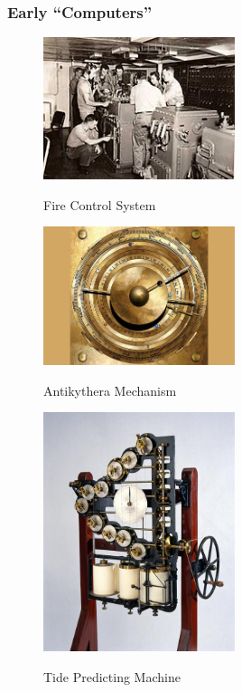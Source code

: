 \documentclass{beamer}
\begin{document}
%
%
\begin{frame}
  \frametitle{Early ``Computers''}
  \begin{minipage}{0.49\textwidth}
    \begin{figure}
      \includegraphics[width=0.5\textwidth]{./imgs/targeting.jpg}
      \label{fig:target}
      \caption{Fire Control System}
    \end{figure}
    \begin{figure}
      \includegraphics[width=0.5\textwidth]{./imgs/oomechanism.jpg}
      \label{fig:oomechanism}
      \caption{Antikythera Mechanism}
    \end{figure}
  \end{minipage}
  \begin{minipage}{0.49\textwidth}
    \begin{figure}
      \includegraphics[width=0.5\textwidth]{./imgs/tide.jpg}
      \label{fig:tide}
      \caption{Tide Predicting Machine}
    \end{figure}
  \end{minipage}
\end{frame}
\end{document}
